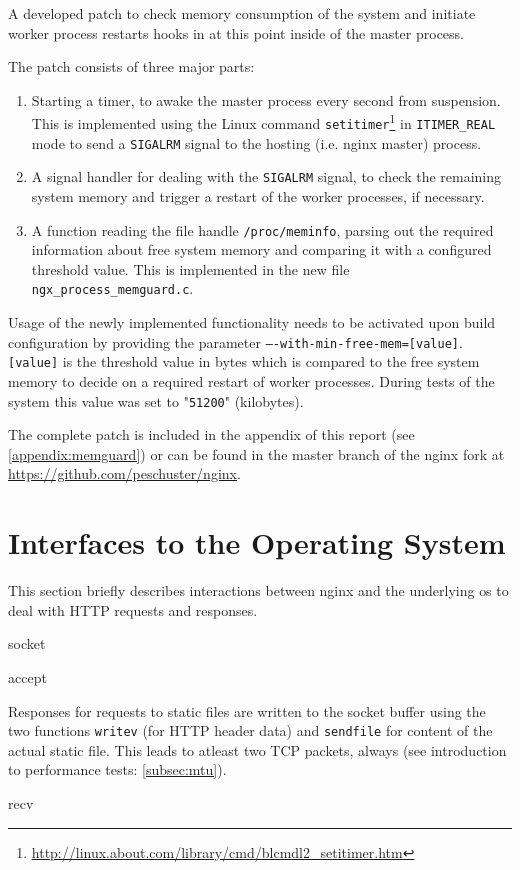 A developed patch to check memory consumption of the system and initiate worker process restarts hooks in at this point inside of the master process. 

The patch consists of three major parts:

\begin{enumerate}

\item Starting a timer, to awake the master process every second from suspension. This is implemented using the Linux command \texttt{setitimer}\footnote{\url{http://linux.about.com/library/cmd/blcmdl2\_setitimer.htm}} in \texttt{ITIMER\_REAL} mode to send a \texttt{SIGALRM} signal to the hosting (i.e. nginx master) process.

\item A signal handler for dealing with the \texttt{SIGALRM} signal, to check the remaining system memory and trigger a restart of the worker processes, if necessary.

\item A function reading the file handle \texttt{/proc/meminfo}, parsing out the required information about free system memory and comparing it with a configured threshold value. This is implemented in the new file \texttt{ngx\_process\_memguard.c}.
\end{enumerate}

Usage of the newly implemented functionality needs to be activated upon build configuration by providing the parameter \texttt{----with-min-free-mem=[value]}. \texttt{[value]} is the threshold value in bytes which is compared to the free system memory to decide on a required restart of worker processes. During tests of the system this value was set to "\texttt{51200}" (kilobytes).

The complete patch is included in the appendix of this report (see \ref{appendix:memguard}) or can be found in the master branch of the nginx fork at \url{https://github.com/peschuster/nginx}.

\section{Interfaces to the Operating System}

This section briefly describes interactions between nginx and the underlying \gls{os} to deal with HTTP requests and responses.

socket

accept

Responses for requests to static files are written to the socket buffer using the two functions \texttt{writev} (for HTTP header data) and \texttt{sendfile} for content of the actual static file. This leads to atleast two TCP packets, always (see introduction to performance tests: \ref{subsec:mtu}).

recv